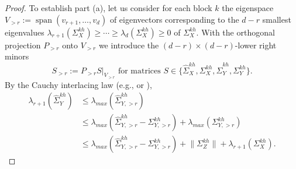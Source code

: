 \documentclass[preprint,aos]{imsart}
\numberwithin{equation}{section}
\theoremstyle{remark}
\DeclareMathOperator{\spann}{span}
\providecommand{\norm}[1]{\lVert #1 \rVert}
\renewcommand{\le}{\leqslant}
\renewcommand{\ge}{\geqslant}
\begin{document}
\begin{appendix}
\begin{proof}\mbox{}
To establish part (a), let us consider for each block $k$ the  eigenspace $V_{>r}:=\spann(v_{r+1},\ldots,v_d)$ of eigenvectors corresponding to the $d-r$ smallest eigenvalues  $\lambda_{r+1}( \Sigma_X^{kh})\ge\cdots\ge\lambda_d( \Sigma_X^{kh})\ge 0$ of $\Sigma_X^{kh}$. With the orthogonal projection $P_{>r}$ onto $V_{>r}$ we introduce the $(d-r)\times (d-r)$-lower right minors
\begin{equation}\label{EqMinor}
S_{>r}:=P_{>r}S|_{V_{>r}}\text{ for matrices } S\in\{\hat \Sigma_X^{kh},\Sigma_X^{kh},\hat \Sigma_Y^{kh},\Sigma_Y^{kh}\}.
\end{equation}
By the Cauchy interlacing law (e.g., \citet{johnstone2001} or \citet{tao2012}),
\begin{align*}
\lambda_{r+1}(\hat\Sigma_Y^{kh})&\le \lambda_{max}(\hat \Sigma^{kh}_{Y,>r})\\
&\le \lambda_{max}(\hat \Sigma^{kh}_{Y,>r}-\Sigma^{kh}_{Y,>r})+\lambda_{max}(\Sigma_{Y,>r}^{kh})\\
&\le \lambda_{max}(\hat \Sigma^{kh}_{Y,>r}-\Sigma^{kh}_{Y,>r})+\norm{\Sigma^{kh}_{Z}}+\lambda_{r+1}(\Sigma_X^{kh}).
\end{align*}


\end{proof}
\end{appendix}
\end{document}
